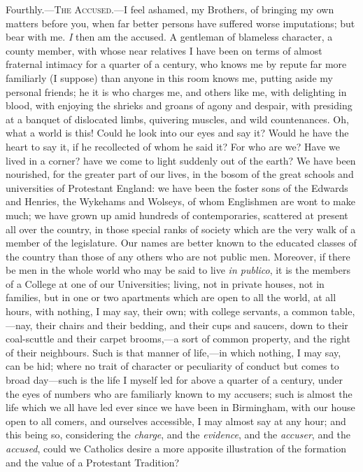 Fourthly.—T\textsc{he} A\textsc{ccused}.—I feel ashamed, my
Brothers, of bringing my own matters before you, when far
better persons have suffered worse imputations; but bear
with me. \emph{I} then am the accused. A gentleman of
blameless character, a county member, with whose near
relatives I have been on terms of almost fraternal
intimacy for a quarter of a century, who knows me by
repute far more familiarly (I suppose) than anyone in
this room knows me, putting aside my personal friends; he
it is who charges me, and others like me, with delighting
in blood, with enjoying the shrieks and groans of agony
and despair, with presiding at a banquet of dislocated
limbs, quivering muscles, and wild countenances. Oh, what
a world is this! Could he look into our eyes and say it?
Would he have the heart to say it, if he recollected of
whom he said it? For who are we? Have we lived in a
corner? have we come to light suddenly out of the earth?
We have been nourished, for the greater part of our
lives, in the bosom of the great schools and universities
of Protestant England: we have been the foster sons of
the Edwards and Henries, the Wykehams and Wolseys, of
whom Englishmen are wont to make much; we have grown up
amid hundreds of contemporaries, scattered at present all
over the country, in those special ranks of society which
are the very walk of a member of the legislature. Our
names are better known to the educated classes of the
country than those of any others who are not public men.
Moreover, if there be men in the whole world who may be
said to live \emph{in publico}, it is the members of a
College at one of our Universities; living, not in
private houses, not in families, but in one or two
apartments which are open to all the world, at all hours,
with nothing, I may say, their own; with college
servants, a common table,—nay, their chairs and
their bedding, and their cups and saucers, down to their
coal-scuttle and their carpet brooms,—a sort of
common property, and the right of their neighbours. Such
is that manner of life,—in which nothing, I may say,
can be hid; where no trait of character or peculiarity of
conduct but comes to broad day—such is the life I
myself led for above a quarter of a century, under the
eyes of numbers who are familiarly known to my accusers;
such is almost the life which we all have led ever since
we have been in Birmingham, with our house open to all
comers, and ourselves accessible, I may almost say at any
hour; and this being so, considering the \emph{charge},
and the \emph{evidence}, and the \emph{accuser}, and
the \emph{accused}, could we Catholics desire a more
apposite illustration of the formation and the value of a
Protestant Tradition?

